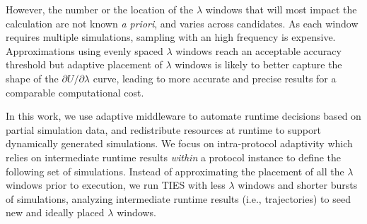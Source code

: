 However, the number or the location of the $\lambda$ windows that will most
impact the calculation are not known \textit{a priori}, and varies across
candidates. As each window requires multiple simulations, sampling
with an high frequency is expensive. %
Approximations using evenly spaced $\lambda$ windows reach an acceptable
accuracy threshold but adaptive placement of $\lambda$ windows is likely to
better capture the shape of the $\partial U/\partial\lambda$ curve, leading
to more accurate and precise results for a comparable computational cost.

In this work, we use adaptive middleware to automate runtime decisions based
on partial simulation data, and redistribute resources at runtime
to support dynamically generated simulations. We focus on 
intra-protocol adaptivity which relies on %
intermediate runtime results
\textit{within} a protocol instance to define the %
following set of %
simulations. %
Instead of approximating the placement of all the $\lambda$ windows prior to
execution, we run TIES with less $\lambda$ windows and shorter bursts of
simulations, analyzing intermediate runtime results (i.e., trajectories) to
seed new and ideally placed $\lambda$ windows.


  


